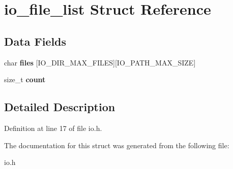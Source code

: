 \hypertarget{structio__file__list}{}\section{io\+\_\+file\+\_\+list Struct Reference}
\label{structio__file__list}
\subsection*{Data Fields}
\begin{DoxyCompactItemize}
\item 
char {\bfseries files} \mbox{[}I\+O\+\_\+\+D\+I\+R\+\_\+\+M\+A\+X\+\_\+\+F\+I\+L\+ES\mbox{]}\mbox{[}I\+O\+\_\+\+P\+A\+T\+H\+\_\+\+M\+A\+X\+\_\+\+S\+I\+ZE\mbox{]}\hypertarget{structio__file__list_aea2e7d487e7a0ce1737212bb7679dbcc}{}\label{structio__file__list_aea2e7d487e7a0ce1737212bb7679dbcc}

\item 
size\+\_\+t {\bfseries count}\hypertarget{structio__file__list_a76d971a3c552bc58ba9f0d5fceae9806}{}\label{structio__file__list_a76d971a3c552bc58ba9f0d5fceae9806}

\end{DoxyCompactItemize}


\subsection{Detailed Description}


Definition at line 17 of file io.\+h.



The documentation for this struct was generated from the following file\+:\begin{DoxyCompactItemize}
\item 
io.\+h\end{DoxyCompactItemize}
